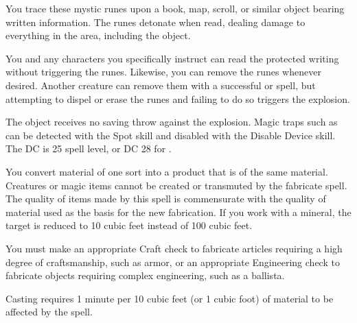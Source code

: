 \begin{spelleffect}
You trace these mystic runes upon a book, map, scroll, or similar object bearing written information. The runes detonate when read, dealing damage to everything in the area, including the object.
\par You and any characters you specifically instruct can read the protected writing without triggering the runes. Likewise, you can remove the runes whenever desired. Another creature can remove them with a successful  or  spell, but attempting to dispel or erase the runes and failing to do so triggers the explosion.
\end{spelleffect}
\begin{spellnotes}
The object receives no saving throw against the explosion. Magic traps such as  can be detected with the Spot skill and disabled with the Disable Device skill. The DC is 25 \add spell level, or DC 28 for .
\end{spellnotes}

\spellrng{\rngclose}
\begin{spelleffect}
You convert material of one sort into a product that is of the same material. Creatures or magic items cannot be created or transmuted by the fabricate spell. The quality of items made by this spell is commensurate with the quality of material used as the basis for the new fabrication. If you work with a mineral, the target is reduced to 10 cubic feet instead of 100 cubic feet.
\par You must make an appropriate Craft check to fabricate articles requiring a high degree of craftsmanship, such as armor, or an appropriate Engineering check to fabricate objects requiring complex engineering, such as a ballista.
\par Casting requires 1 minute per 10 cubic feet (or 1 cubic foot) of material to be affected by the spell.
\end{spelleffect}

